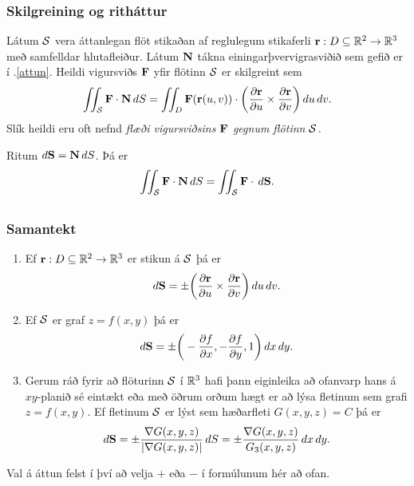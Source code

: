 \subsubsection{Skilgreining og ritháttur \rtask{}}
 Látum $\cal S$ vera áttanlegan flöt stikaðan
af reglulegum stikaferli  $\mbox{${\bf r}$}:D\subseteq{\mathbb R}^2\rightarrow {\mathbb R}^3$ með
samfelldar hlutafleiður.  Látum $\mbox{${\bf N}$}$ tákna einingarþver\-vigrasviðið
sem gefið er í \kaflanr.\ref{attun}.  Heildi vigursviðs $\mbox{${\bf F}$}$ yfir flötinn $\cal S$ er
skilgreint sem 
$$\int\!\!\!\int_{\cal S} \mbox{${\bf F}$}\cdot\mbox{${\bf N}$}\,dS
=\int\!\!\!\int_D \mbox{${\bf F}$}(\mbox{${\bf r}$}(u,v))\cdot \bigg(
\frac{\partial \mbox{${\bf r}$}}{\partial u}\times\frac{\partial \mbox{${\bf r}$}}{\partial
  v}\bigg)\,
du\,dv.$$
Slík heildi eru oft nefnd \emph{flæði vigursviðsins $\mbox{${\bf F}$}$ gegnum flötinn $\cal S$.}

\bigskip
 Ritum $d\mbox{${\bf S}$}=\mbox{${\bf N}$}\,dS$.  Þá  er 
$$\int\!\!\!\int_{\cal S} \mbox{${\bf F}$}\cdot\mbox{${\bf N}$}\,dS=\int\!\!\!\int_{\cal S} \mbox{${\bf F}$}\cdot\,d\mbox{${\bf S}$}.$$







\subsection{} 

\subsubsection{Samantekt \rtask{}}
  
\begin{enumerate}
\item Ef $\mbox{${\bf r}$}:D\subseteq{\mathbb R}^2\rightarrow {\mathbb R}^3$ er stikun á $\cal S$ þá
  er $$d\mbox{${\bf S}$}=\pm \bigg(\frac{\partial \mbox{${\bf r}$}}{\partial u}\times\frac{\partial
  \mbox{${\bf r}$}}{\partial v}\bigg)\,du\,dv.$$
\item Ef $\cal S$ er graf $z=f(x,y)$ þá er 
$$d\mbox{${\bf S}$}=\pm\bigg(-\frac{\partial f}{\partial x},-\frac{\partial
  f}{\partial y},1\bigg)\,dx\,dy.$$
\item Gerum ráð fyrir að flöturinn $\cal S$ í ${\mathbb R}^3$ hafi þann eiginleika að
  ofanvarp hans á $xy$-planið sé eintækt eða með öðrum orðum hægt er
  að lýsa fletinum sem grafi $z=f(x,y)$.
Ef fletinum $\cal S$ er lýst sem 
hæðarfleti $G(x,y,z)=C$ þá er  
$$d\mbox{${\bf S}$}=\pm\frac{\nabla G(x,y,z)}{|\nabla G(x,y,z)|}\,dS=
\pm\frac{\nabla G(x,y,z)}{G_3(x,y,z)}\,dx\,dy.$$
\end{enumerate}
Val á áttun felst í því að velja $+$ eða $-$ í formúlunum hér að
ofan.  





